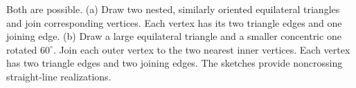 Both are possible. (a) Draw two nested, similarly oriented equilateral triangles and join corresponding vertices. Each vertex has its two triangle edges and one joining edge. (b) Draw a large equilateral triangle and a smaller concentric one rotated $60^\circ$. Join each outer vertex to the two nearest inner vertices. Each vertex has two triangle edges and two joining edges. The sketches provide noncrossing straight-line realizations.
